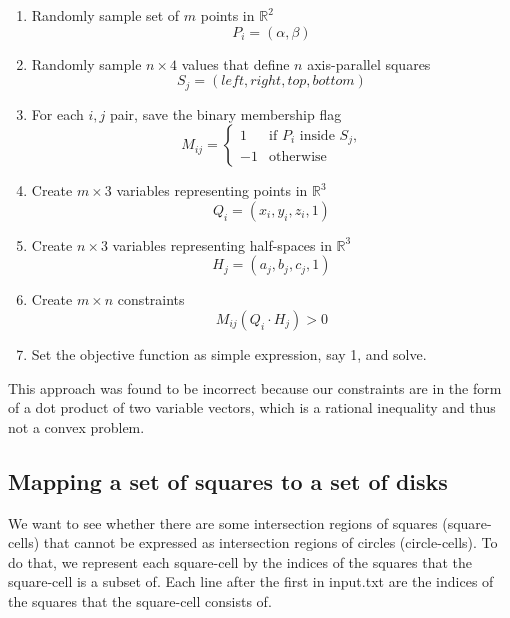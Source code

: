 \documentclass{NSF}
\begin{document}
\begin{enumerate}
\item Randomly sample set of $m$ points in $\mathbb{R}^2$ \begin{equation*}
				P_i = (\alpha, \beta)
\end{equation*}
\item Randomly sample $n \times 4$ values that define $n$ axis-parallel squares \begin{equation*}
				S_j=(left,right,top,bottom)
			\end{equation*}
\item For each $i,j$ pair, save the binary membership flag \begin{equation*}
M_{ij} =\begin{cases}
            	1 & \text{if $P_i$ inside $S_j$,} \\
                -1 & \text{otherwise}
            \end{cases}
\end{equation*}
\item Create $m \times 3$ variables representing points in $\mathbb{R}^3 $ \begin{equation*}
			Q_i = (x_i,y_i,z_i, 1)
\end{equation*}
\item Create $n \times 3$ variables representing half-spaces in $\mathbb{R}^3 $ \begin{equation*}
				H_j = (a_j,b_j,c_j, 1)
\end{equation*}
\item Create $m \times n$ constraints \begin{equation*}
			M_{ij}(Q_i \cdot H_j) > 0
\end{equation*}
\item Set the objective function as simple expression, say 1, and solve.


\end{enumerate}
This approach was found to be incorrect because our constraints are in the form of a dot product of two variable vectors, which is a rational inequality and thus not a convex problem.


\subsection{Mapping a set of squares to a set of disks}

We want to see whether there are some intersection regions of squares (square-cells) that cannot be expressed as intersection regions of circles (circle-cells). To do that, we represent each square-cell by the indices of the squares that the square-cell is a subset of. Each line after the first in input.txt are the indices of the squares that the square-cell consists of. 
\end{document}
